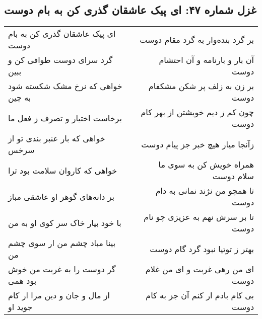\begin{center}
\section*{غزل شماره ۴۷: ای پیک عاشقان گذری کن به بام دوست}
\label{sec:047}
\begin{longtable}{l p{0.5cm} r}
ای پیک عاشقان گذری کن به بام دوست
&&
بر گرد بنده‌وار به گرد مقام دوست
\\
گرد سرای دوست طوافی کن و ببین
&&
آن بار و بارنامه و آن احتشام دوست
\\
خواهی که نرخ مشک شکسته شود به چین
&&
بر زن به زلف پر شکن مشکفام دوست
\\
برخاست اختیار و تصرف ز فعل ما
&&
چون کم ز دیم خویشتن از بهر کام دوست
\\
خواهی که بار عنبر بندی تو از سرخس
&&
زآنجا میار هیچ خبر جز پیام دوست
\\
خواهی که کاروان سلامت بود ترا
&&
همراه خویش کن به سوی ما سلام دوست
\\
بر دانه‌های گوهر او عاشقی مباز
&&
تا همچو من نژند نمانی به دام دوست
\\
با خود بیار خاک سر کوی او به من
&&
تا بر سرش نهم به عزیزی چو نام دوست
\\
بینا مباد چشم من ار سوی چشم من
&&
بهتر ز توتیا نبود گرد گام دوست
\\
گر دوست را به غربت من خوش بود همی
&&
ای من رهی غربت و ای من غلام دوست
\\
از مال و جان و دین مرا ار کام جوید او
&&
بی کام بادم ار کنم آن جز به کام دوست
\\
\end{longtable}
\end{center}
